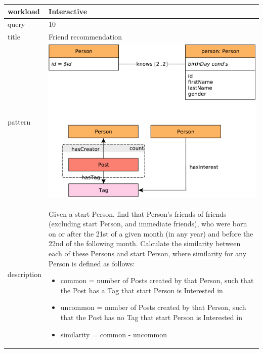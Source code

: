 \renewcommand*{\arraystretch}{1.1}

\noindent\begin{tabularx}{17cm}{|p{1.95cm}|X|}
	\hline
	workload    & Interactive \\ \hline
%
	query       & 10 \\ \hline
%
	title       & Friend recommendation \\ \hline
%
    pattern     & \hfill\includegraphics[scale=\patternscale,margin=0cm .2cm]{patterns/interactive-complex-read-10}\hfill\vadjust{} \\ \hline
%
	description & Given a start Person, find that Person's friends of friends (excluding
start Person, and immediate friends), who were born on or after the 21st
of a given month (in any year) and before the 22nd of the following
month. Calculate the similarity between each of these Persons and start
Person, where similarity for any Person is defined as follows:

\begin{itemize}
\tightlist
\item
  common = number of Posts created by that Person, such that the Post
  has a Tag that start Person is Interested in
\item
  uncommon = number of Posts created by that Person, such that the Post
  has no Tag that start Person is Interested in
\item
  similarity = common - uncommon
\end{itemize}
 \\ \hline
	

\end{tabularx}
